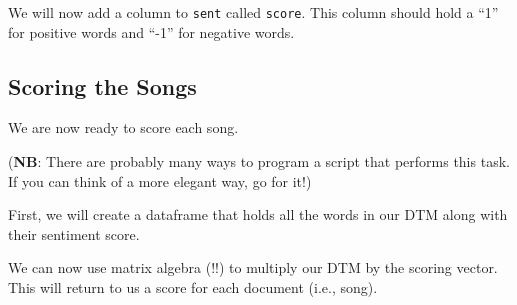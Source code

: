 \documentclass[]{book}
\newenvironment{Shaded}{\begin{snugshade}}{\end{snugshade}}
\newcommand{\KeywordTok}[1]{\textcolor[rgb]{0.13,0.29,0.53}{\textbf{#1}}}
\newcommand{\DataTypeTok}[1]{\textcolor[rgb]{0.13,0.29,0.53}{#1}}
\newcommand{\DecValTok}[1]{\textcolor[rgb]{0.00,0.00,0.81}{#1}}
\newcommand{\StringTok}[1]{\textcolor[rgb]{0.31,0.60,0.02}{#1}}
\newcommand{\CommentTok}[1]{\textcolor[rgb]{0.56,0.35,0.01}{\textit{#1}}}
\newcommand{\OperatorTok}[1]{\textcolor[rgb]{0.81,0.36,0.00}{\textbf{#1}}}
\newcommand{\NormalTok}[1]{#1}
\begin{document}
We will now add a column to \texttt{sent} called \texttt{score}. This
column should hold a ``1'' for positive words and ``-1'' for negative
words.

\begin{Shaded}
\end{Shaded}

\subsection{Scoring the Songs}\label{scoring-the-songs}

We are now ready to score each song.

(\textbf{NB}: There are probably many ways to program a script that
performs this task. If you can think of a more elegant way, go for it!)

First, we will create a dataframe that holds all the words in our DTM
along with their sentiment score.

\begin{Shaded}
\end{Shaded}

We can now use matrix algebra (!!) to multiply our DTM by the scoring
vector. This will return to us a score for each document (i.e., song).
\end{document}

